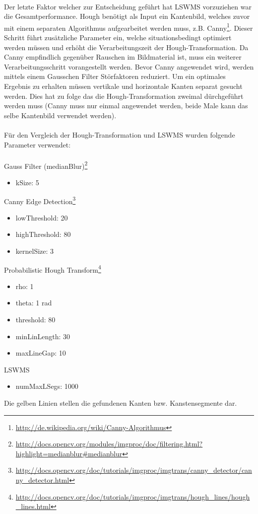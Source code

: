 \paragraph{}
Der letzte Faktor welcher zur Entscheidung geführt hat LSWMS vorzuziehen war die Gesamtperformance. Hough benötigt als Input ein Kantenbild, welches zuvor mit einem separaten Algorithmus aufgearbeitet werden muss, z.B. Canny\footnote{\protect\url{http://de.wikipedia.org/wiki/Canny-Algorithmus}}. Dieser Schritt führt zusätzliche Parameter ein, welche situationsbedingt optimiert werden müssen und erhöht die Verarbeitungszeit der Hough-Transformation. Da Canny empfindlich gegenüber Rauschen im Bildmaterial ist, muss ein weiterer Verarbeitungsschritt vorangestellt werden. Bevor Canny angewendet wird, werden mittels einem Gausschen Filter Störfaktoren reduziert. Um ein optimales Ergebnis zu erhalten müssen vertikale und horizontale Kanten separat gesucht werden. Dies hat zu folge das die Hough-Transformation zweimal dürchgeführt werden muss (Canny muss nur einmal angewendet werden, beide Male kann das selbe Kantenbild verwendet werden).
\paragraph{}
Für den Vergleich der Hough-Transformation und LSWMS wurden folgende Parameter verwendet:
\paragraph{}
Gauss Filter (medianBlur)\footnote{\protect\url{http://docs.opencv.org/modules/imgproc/doc/filtering.html?highlight=medianblur#medianblur}}
\begin{itemize}
	\item kSize: 5
\end{itemize}
Canny Edge Detection\footnote{\protect\url{http://docs.opencv.org/doc/tutorials/imgproc/imgtrans/canny_detector/canny_detector.html}}
\begin{itemize}
	\item lowThreshold: 20
	\item highThreshold: 80
	\item kernelSize: 3
\end{itemize}
Probabilistic Hough Transform\footnote{\protect\url{http://docs.opencv.org/doc/tutorials/imgproc/imgtrans/hough_lines/hough_lines.html}}
\begin{itemize}
	\item rho: 1
	\item theta: 1 rad
	\item threshold: 80
	\item minLinLength: 30
	\item maxLineGap: 10
\end{itemize}
LSWMS
\begin{itemize}
	\item numMaxLSegs: 1000
\end{itemize}
\noindent
Die gelben Linien stellen die gefundenen Kanten bzw. Kanstensegmente dar.
\pagebreak

